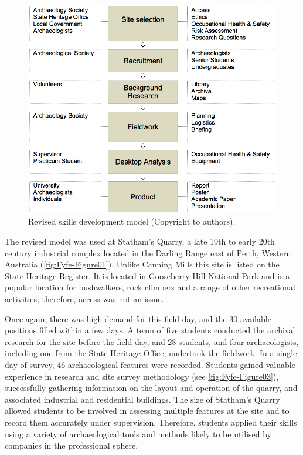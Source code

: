 \documentclass{ijsra}
\begin{document}
   	\begin{figure} %
   		\includegraphics[width=\linewidth]{figures/Fyfe-Figure02}
   		\caption{Revised skills development model (Copyright to authors).}
   		\centering
   		\label{fig:Fyfe-Figure02}
   	\end{figure}


The revised model was used at Statham’s Quarry, a late 19th to early 20th century industrial complex located in the Darling Range east of Perth, Western Australia (\cref{fig:Fyfe-Figure01}). Unlike Canning Mills this site is listed on the State Heritage Register. It is located in Gooseberry Hill National Park and is a popular location for bushwalkers, rock climbers and a range of other recreational activities; therefore, access was not an issue.

Once again, there was high demand for this field day, and the 30 available positions filled within a few days. A team of five students conducted the archival research for the site before the field day, and 28 students, and four archaeologists, including one from the State Heritage Office, undertook the fieldwork. 
In a single day of survey, 46 archaeological features were recorded. 
Students gained valuable experience in research and site survey methodology (see \cref{fig:Fyfe-Figure03}), successfully gathering information on the layout and operation of the quarry, and associated industrial and residential buildings. 
The size of Statham’s Quarry allowed students to be involved in assessing multiple features at the site and to record them accurately under supervision. Therefore, students applied their skills using a variety of archaeological tools and methods likely to be utilised by companies in the professional sphere.
\end{document}
